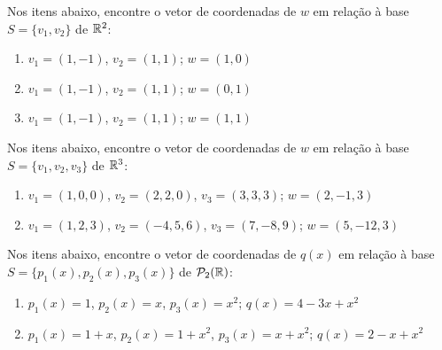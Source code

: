 \documentclass[12pt]{exam}
\begin{document}
    \begin{exercicio}
        Nos itens abaixo, encontre o vetor de coordenadas de $w$ em relação à base $S = \{v_1, v_2\}$ de $\mathbb{R}^2$:
        \begin{enumerate}[label={\alph*})]
            \item $v_1 = (1, -1)$, $v_2 = (1, 1)$; $w = (1, 0)$
            \item $v_1 = (1, -1)$, $v_2 = (1, 1)$; $w = (0, 1)$
            \item $v_1 = (1, -1)$, $v_2 = (1, 1)$; $w = (1, 1)$
        \end{enumerate}
    \end{exercicio}

    \begin{exercicio}
        Nos itens abaixo, encontre o vetor de coordenadas de $w$ em relação à base $S = \{v_1, v_2, v_3\}$ de $\mathbb{R}^3$:
        \begin{enumerate}[label={\alph*})]
            \item $v_1 = (1, 0, 0)$, $v_2 = (2, 2, 0)$, $v_3 = (3, 3, 3)$; $w = (2, -1, 3)$
            \item $v_1 = (1, 2, 3)$, $v_2 = (-4, 5, 6)$, $v_3 = (7, -8, 9)$; $w = (5, -12, 3)$
        \end{enumerate}
    \end{exercicio}

    \begin{exercicio}
        Nos itens abaixo, encontre o vetor de coordenadas de $q(x)$ em relação à base $S = \{p_1(x), p_2(x), p_3(x)\}$ de $\mathcal{P}_2(\mathbb{R})$:
        \begin{enumerate}[label={\alph*})]
            \item $p_1(x) = 1$, $p_2(x) = x$, $p_3(x) = x^2$; $q(x) = 4 - 3x + x^2$
            \item $p_1(x) = 1 + x$, $p_2(x) = 1 + x^2$, $p_3(x) = x + x^2$; $q(x) = 2 - x + x^2$
        \end{enumerate}
    \end{exercicio}
\end{document}
